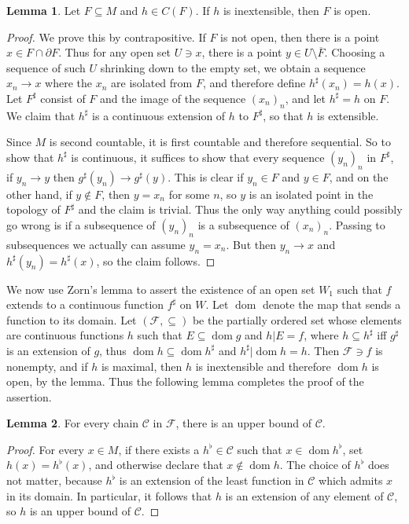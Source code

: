 \documentclass[10pt]{article}
\newcommand{\dom}{\operatorname{dom}}
\theoremstyle{definition}
\newtheorem{lemma}{Lemma}[exer]
\begin{document}
\begin{lemma}
Let $F \subseteq M$ and $h \in C(F)$. If $h$ is inextensible, then $F$ is open.
\end{lemma}
\begin{proof}
We prove this by contrapositive.
If $F$ is not open, then there is a point $x \in F \cap \partial F$.
Thus for any open set $U \ni x$, there is a point $y \in U \setminus \overline F$.
Choosing a sequence of such $U$ shrinking down to the empty set, we obtain a sequence $x_n \to x$ where the $x_n$ are isolated from $F$, and therefore define $h^\sharp(x_n) = h(x)$.
Let $F^\sharp$ consist of $F$ and the image of the sequence $(x_n)_n$, and let $h^\sharp = h$ on $F$.
We claim that $h^\sharp$ is a continuous extension of $h$ to $F^\sharp$, so that $h$ is extensible.

Since $M$ is second countable, it is first countable and therefore sequential.
So to show that $h^\sharp$ is continuous, it suffices to show that every sequence $(y_n)_n$ in $F^\sharp$, if $y_n \to y$ then $g^\sharp(y_n) \to g^\sharp(y)$.
This is clear if $y_n \in F$ and $y \in F$, and on the other hand, if $y \notin F$, then $y = x_n$ for some $n$, so $y$ is an isolated point in the topology of $F^\sharp$ and the claim is trivial.
Thus the only way anything could possibly go wrong is if a subsequence of $(y_n)_n$ is a subsequence of $(x_n)_n$.
Passing to subsequences we actually can assume $y_n = x_n$.
But then $y_n \to x$ and $h^\sharp(y_n) = h^\sharp(x)$, so the claim follows.
\end{proof}

We now use Zorn's lemma to assert the existence of an open set $W_1$ such that $f$ extends to a continuous function $f^\sharp$ on $W$.
Let $\dom$ denote the map that sends a function to its domain.
Let $(\mathcal F, \subseteq)$ be the partially ordered set whose elements are continuous functions $h$ such that $E \subseteq \dom g$ and $h|E = f$, where $h \subseteq h^\sharp$ iff $g^\sharp$ is an extension of $g$, thus $\dom h \subseteq \dom h^\sharp$ and $h^\sharp|\dom h = h$.
Then $\mathcal F \ni f$ is nonempty, and if $h$ is maximal, then $h$ is inextensible and therefore $\dom h$ is open, by the lemma.
Thus the following lemma completes the proof of the assertion.

\begin{lemma}
For every chain $\mathcal C$ in $\mathcal F$, there is an upper bound of $\mathcal C$.
\end{lemma}
\begin{proof}
For every $x \in M$, if there exists a $h^\flat \in \mathcal C$ such that $x \in \dom h^\flat$, set $h(x) = h^\flat(x)$, and otherwise declare that $x \notin \dom h$.
The choice of $h^\flat$ does not matter, because $h^\flat$ is an extension of the least function in $\mathcal C$ which admits $x$ in its domain.
In particular, it follows that $h$ is an extension of any element of $\mathcal C$, so $h$ is an upper bound of $\mathcal C$.
\end{proof}
\end{document}
